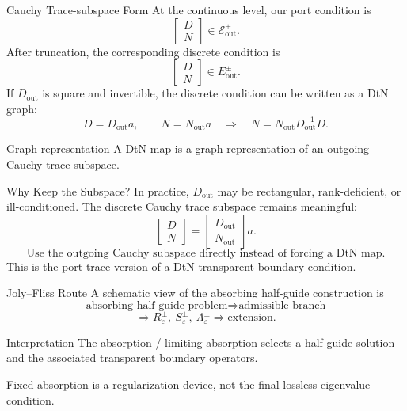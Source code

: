 \documentclass[aspectratio=169]{beamer}
\begin{document}
\begin{frame}{Cauchy Trace-subspace Form}
  At the continuous level, our port condition is
  \[
    \begin{bmatrix}D\\N\end{bmatrix}
    \in
    \mathcal E_{\mathrm{out}}^\pm.
  \]
  After truncation, the corresponding discrete condition is
  \[
    \begin{bmatrix}D\\N\end{bmatrix}
    \in
    E_{\mathrm{out}}^\pm.
  \]
  If \(D_{\mathrm{out}}\) is square and invertible, the discrete condition can
  be written as a DtN graph:
  \[
    D=D_{\mathrm{out}}a,
    \qquad
    N=N_{\mathrm{out}}a
    \quad\Longrightarrow\quad
    N=N_{\mathrm{out}}D_{\mathrm{out}}^{-1}D.
  \]
  \begin{block}{Graph representation}
    A DtN map is a graph representation of an outgoing Cauchy trace subspace.
  \end{block}
\end{frame}

\begin{frame}{Why Keep the Subspace?}
  In practice, \(D_{\mathrm{out}}\) may be rectangular, rank-deficient, or
  ill-conditioned.  The discrete Cauchy trace subspace remains meaningful:
  \[
    \begin{bmatrix}D\\N\end{bmatrix}
    =
    \begin{bmatrix}
      D_{\mathrm{out}}\\
      N_{\mathrm{out}}
    \end{bmatrix}a.
  \]
  \[
    \boxed{
      \text{Use the outgoing Cauchy subspace directly instead of forcing a DtN map.}
    }
  \]
  This is the port-trace version of a DtN transparent boundary condition.
\end{frame}


\begin{frame}{Joly--Fliss Route}
  A schematic view of the absorbing half-guide construction is
  \[
    \text{absorbing half-guide problem}
    \Longrightarrow
    \text{admissible branch}
  \]
  \[
    \Longrightarrow
    R_\varepsilon^\pm,\ S_\varepsilon^\pm,\ \Lambda_\varepsilon^\pm
    \Longrightarrow
    \text{extension}.
  \]
  \begin{block}{Interpretation}
    The absorption / limiting absorption selects a half-guide solution and
    the associated transparent boundary operators.
  \end{block}
  Fixed absorption is a regularization device, not the final lossless
  eigenvalue condition.
\end{frame}
\end{document}
